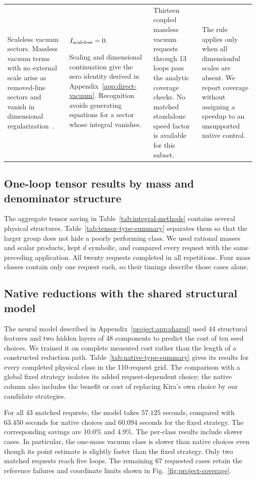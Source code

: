 \begin{landscape}
\begin{longtable}{@{}>{\raggedright\arraybackslash}p{3.9cm}>{\raggedright\arraybackslash}p{8.0cm}>{\raggedright\arraybackslash}p{5.1cm}>{\raggedright\arraybackslash}p{6.2cm}@{}}
Scaleless vacuum sectors. Massless vacuum terms with no external scale arise as removed-line sectors and vanish in dimensional regularization~\cite{Weinzierl2022}.
& $\displaystyle I_{\rm scaleless}=0$.
\par Scaling and dimensional continuation give the zero identity derived in Appendix~\ref{app:direct-vacuum}. Recognition avoids generating equations for a sector whose integral vanishes.
& Thirteen coupled massless vacuum requests through 13 loops pass the analytic coverage checks. No matched standalone speed factor is available for this subset.
& The rule applies only when all dimensionful scales are absent. We report coverage without assigning a speedup to an unsupported native control.\\
\end{longtable}
\end{landscape}

\subsection{One-loop tensor results by mass and denominator structure}
The aggregate tensor saving in Table~\ref{tab:integral-methods} contains several physical structures. Table~\ref{tab:tensor-type-summary} separates them so that the larger group does not hide a poorly performing class. We used rational masses and scalar products, kept $d$ symbolic, and compared every request with the same preceding application. All twenty requests completed in all repetitions. Four mass classes contain only one request each, so their timings describe those cases alone.


\subsection{Native reductions with the shared structural model}
The neural model described in Appendix~\ref{project:app:shared} used 44 structural features and two hidden layers of 48 components to predict the cost of ten seed choices. We trained it on complete measured cost rather than the length of a constructed reduction path. Table~\ref{tab:native-type-summary} gives its results for every completed physical class in the 110-request grid. The comparison with a global fixed strategy isolates its added request-dependent choice; the native column also includes the benefit or cost of replacing Kira's own choice by our candidate strategies.

For all 43 matched requests, the model takes $57.125$ seconds, compared with $63.450$ seconds for native choices and $60.094$ seconds for the fixed strategy. The corresponding savings are 10.0\% and 4.9\%. The per-class results include slower cases. In particular, the one-mass vacuum class is slower than native choices even though its point estimate is slightly faster than the fixed strategy. Only two matched requests reach five loops. The remaining 67 requested cases retain the reference failures and coordinate limits shown in Fig.~\ref{fig:project-coverage}.

